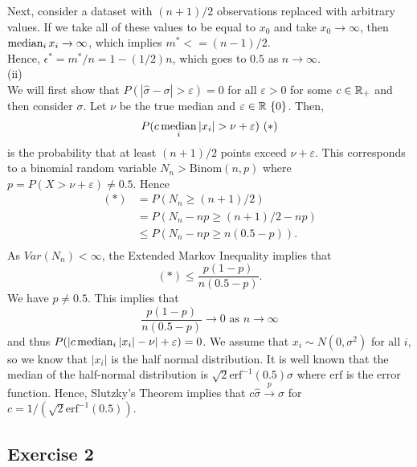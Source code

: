 \noindent Next, consider a dataset with $(n+1)/2$ observations replaced with arbitrary values. If we take all of these values to be equal to $x_0$ and take $x_0 \xrightarrow{} \infty$, then $\operatorname*{median}_i x_i \xrightarrow{} \infty$, which implies $m^* <= (n-1)/2$.\\

\noindent Hence, $\epsilon^* = m^*/n = 1 - (1/2)n$, which goes to $0.5$ as $n \xrightarrow{} \infty$.\\

\noindent (ii)\\

\noindent We will first show that $P(|\hat\sigma - \sigma| > \varepsilon) = 0$ for all $\varepsilon > 0$ for some $c \in \mathbb{R}_+$ and then consider $\sigma$. Let $\nu$ be the true median and $\varepsilon \in \bbR \ \{0\}$. Then, 
\begin{equation*}
    P(c\operatorname*{median}_i|x_i| > \nu + \varepsilon)\ (*)
\end{equation*} 
is the probability that at least $(n+1)/2$ points exceed $\nu + \varepsilon$. This corresponds to a binomial random variable $N_n > \mathrm{Binom}(n,p)$ where $p = P(X > \nu + \varepsilon) \not= 0.5$. Hence
\begin{align}
    (*) &= P(N_n \geq (n+1)/2)\\
        &= P(N_n - np \geq (n+1)/2 - np)\\
        &\leq P(N_n - np \geq n(0.5-p)).\\
\end{align}
As $Var(N_n) < \infty$, the Extended Markov Inequality implies that
\begin{equation*}
    (*) \leq \frac{p(1-p)}{n(0.5-p)}.
\end{equation*}
We have $p \not= 0.5$. This implies that
\begin{equation*}
    \frac{p(1-p)}{n(0.5-p)} \xrightarrow{} 0\text{ as } n \xrightarrow{} \infty
\end{equation*}
and thus $P(|c\operatorname*{median}_i|x_i| - \nu| + \varepsilon) = 0$. We assume that $x_i\sim N(0,\sigma^2)$ for all $i$, so we know that $|x_i|$ is the half normal distribution. It is well known that the median of the half-normal distribution is $\sqrt{2} \mathrm{erf}^{-1}(0.5) \sigma$ where $\mathrm{erf}$ is the error function. Hence, Slutzky's Theorem implies that $c\hat\sigma \xrightarrow{p} \sigma$ for $c = 1/(\sqrt{2} \mathrm{erf}^{-1}(0.5))$.

\subsection*{Exercise 2}


